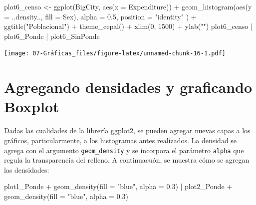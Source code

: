 \documentclass[
  12pt,
]{book}
\newenvironment{Shaded}{\begin{snugshade}}{\end{snugshade}}
\newcommand{\AttributeTok}[1]{\textcolor[rgb]{0.77,0.63,0.00}{#1}}
\newcommand{\DecValTok}[1]{\textcolor[rgb]{0.00,0.00,0.81}{#1}}
\newcommand{\FloatTok}[1]{\textcolor[rgb]{0.00,0.00,0.81}{#1}}
\newcommand{\FunctionTok}[1]{\textcolor[rgb]{0.00,0.00,0.00}{#1}}
\newcommand{\NormalTok}[1]{#1}
\newcommand{\OtherTok}[1]{\textcolor[rgb]{0.56,0.35,0.01}{#1}}
\newcommand{\SpecialCharTok}[1]{\textcolor[rgb]{0.00,0.00,0.00}{#1}}
\newcommand{\StringTok}[1]{\textcolor[rgb]{0.31,0.60,0.02}{#1}}
\begin{document}
\begin{Shaded}
\begin{Highlighting}[]
\NormalTok{plot6\_censo }\OtherTok{\textless{}{-}} \FunctionTok{ggplot}\NormalTok{(BigCity, }\FunctionTok{aes}\NormalTok{(}\AttributeTok{x =}\NormalTok{ Expenditure)) }\SpecialCharTok{+}
  \FunctionTok{geom\_histogram}\NormalTok{(}\FunctionTok{aes}\NormalTok{(}\AttributeTok{y =}\NormalTok{ ..density.., }\AttributeTok{fill =}\NormalTok{ Sex),}
    \AttributeTok{alpha =} \FloatTok{0.5}\NormalTok{, }\AttributeTok{position =} \StringTok{"identity"}
\NormalTok{  ) }\SpecialCharTok{+}
  \FunctionTok{ggtitle}\NormalTok{(}\StringTok{"Poblacional"}\NormalTok{) }\SpecialCharTok{+}
  \FunctionTok{theme\_cepal}\NormalTok{() }\SpecialCharTok{+}
  \FunctionTok{xlim}\NormalTok{(}\DecValTok{0}\NormalTok{, }\DecValTok{1500}\NormalTok{) }\SpecialCharTok{+}
  \FunctionTok{ylab}\NormalTok{(}\StringTok{""}\NormalTok{)}
\NormalTok{plot6\_censo }\SpecialCharTok{|}\NormalTok{ plot6\_Ponde }\SpecialCharTok{|}\NormalTok{ plot6\_SinPonde}
\end{Highlighting}
\end{Shaded}

\texttt{[image: 07-Gráficas\_files/figure-latex/unnamed-chunk-16-1.pdf]}

\hypertarget{agregando-densidades-y-graficando-boxplot}{%
\section{Agregando densidades y graficando Boxplot}\label{agregando-densidades-y-graficando-boxplot}}

Dadas las cualidades de la librería ggplot2, se pueden agregar nuevas capas a los gráficos, particularmente, a los histogramas antes realizados. La densidad se agrega con el argumento \texttt{geom\_density} y se incorpora el parámetro \texttt{alpha} que regula la transparencia del relleno. A continuacuón, se muestra cómo se agregan las densidades:

\begin{Shaded}
\begin{Highlighting}[]
\NormalTok{plot1\_Ponde }\SpecialCharTok{+} \FunctionTok{geom\_density}\NormalTok{(}\AttributeTok{fill =} \StringTok{"blue"}\NormalTok{, }\AttributeTok{alpha =} \FloatTok{0.3}\NormalTok{) }\SpecialCharTok{|}
\NormalTok{  plot2\_Ponde }\SpecialCharTok{+} \FunctionTok{geom\_density}\NormalTok{(}\AttributeTok{fill =} \StringTok{"blue"}\NormalTok{, }\AttributeTok{alpha =} \FloatTok{0.3}\NormalTok{)}
\end{Highlighting}
\end{Shaded}
\end{document}
